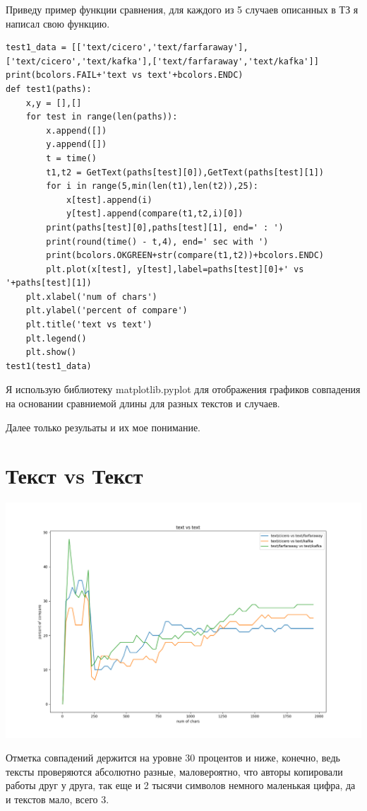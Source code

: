 Приведу пример функции сравнения, для каждого из 5 случаев описанных в ТЗ я написал свою функцию.


\begin{lstlisting}
test1_data = [['text/cicero','text/farfaraway'],['text/cicero','text/kafka'],['text/farfaraway','text/kafka']]
print(bcolors.FAIL+'text vs text'+bcolors.ENDC)
def test1(paths):
    x,y = [],[]
    for test in range(len(paths)):
        x.append([])
        y.append([])
        t = time()
        t1,t2 = GetText(paths[test][0]),GetText(paths[test][1])
        for i in range(5,min(len(t1),len(t2)),25):
            x[test].append(i)
            y[test].append(compare(t1,t2,i)[0])
        print(paths[test][0],paths[test][1], end=' : ')
        print(round(time() - t,4), end=' sec with ')
        print(bcolors.OKGREEN+str(compare(t1,t2))+bcolors.ENDC)
        plt.plot(x[test], y[test],label=paths[test][0]+' vs '+paths[test][1])
    plt.xlabel('num of chars')
    plt.ylabel('percent of compare')
    plt.title('text vs text')
    plt.legend()
    plt.show()
test1(test1_data)
\end{lstlisting}

Я использую библиотеку matplotlib.pyplot для отображения графиков совпадения на основании сравниемой длины для разных текстов и случаев.

Далее только резульаты и их мое понимание.

\section{Текст vs Текст}
\includegraphics[scale=0.5]{pic/1.png}

Отметка совпадений держится на уровне 30 процентов и ниже, конечно, ведь тексты проверяются абсолютно разные, маловероятно, что авторы копировали работы друг у друга, так еще и 2 тысячи символов немного маленькая цифра, да и текстов мало, всего 3.

